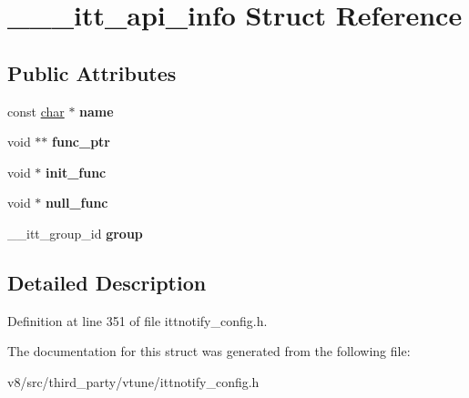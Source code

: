 \hypertarget{struct______itt__api__info}{}\section{\+\_\+\+\_\+\+\_\+itt\+\_\+api\+\_\+info Struct Reference}
\label{struct______itt__api__info}
\subsection*{Public Attributes}
\begin{DoxyCompactItemize}
\item 
\mbox{\label{struct______itt__api__info_abb7f1e06b74fb586eb8d1e7570cd6263}} 
const \mbox{\hyperlink{classchar}{char}} $\ast$ {\bfseries name}
\item 
\mbox{\label{struct______itt__api__info_a3f5d0605499d1a9911080be2fabfc18b}} 
void $\ast$$\ast$ {\bfseries func\+\_\+ptr}
\item 
\mbox{\label{struct______itt__api__info_a21210573f2cde6f6b8c781da860dad7b}} 
void $\ast$ {\bfseries init\+\_\+func}
\item 
\mbox{\label{struct______itt__api__info_ab182f072fe2a2f4740be6b1d0499348f}} 
void $\ast$ {\bfseries null\+\_\+func}
\item 
\mbox{\label{struct______itt__api__info_a42bda2bfa667003e920bbf6995f5d375}} 
\+\_\+\+\_\+itt\+\_\+group\+\_\+id {\bfseries group}
\end{DoxyCompactItemize}


\subsection{Detailed Description}


Definition at line 351 of file ittnotify\+\_\+config.\+h.



The documentation for this struct was generated from the following file\+:\begin{DoxyCompactItemize}
\item 
v8/src/third\+\_\+party/vtune/ittnotify\+\_\+config.\+h\end{DoxyCompactItemize}
